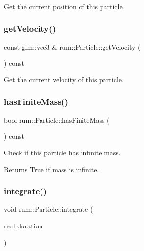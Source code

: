 Get the current position of this particle. \mbox{\label{classrum_1_1_particle_a49fafb2e446e26e2e2bedb772d6643fd}} 
\subsubsection{\texorpdfstring{get\+Velocity()}{getVelocity()}}
{\footnotesize\ttfamily const glm\+::vec3 \& rum\+::\+Particle\+::get\+Velocity (\begin{DoxyParamCaption}{ }\end{DoxyParamCaption}) const}

Get the current velocity of this particle. \mbox{\label{classrum_1_1_particle_a83071b132ef0961b63d05c68dd8ffb51}} 
\subsubsection{\texorpdfstring{has\+Finite\+Mass()}{hasFiniteMass()}}
{\footnotesize\ttfamily bool rum\+::\+Particle\+::has\+Finite\+Mass (\begin{DoxyParamCaption}{ }\end{DoxyParamCaption}) const}

Check if this particle has infinite mass. \begin{DoxyReturn}{Returns}
True if mass is infinite. 
\end{DoxyReturn}
\mbox{\label{classrum_1_1_particle_a6eb27b64ae963d386cf563bafade51c5}} 
\subsubsection{\texorpdfstring{integrate()}{integrate()}}
{\footnotesize\ttfamily void rum\+::\+Particle\+::integrate (\begin{DoxyParamCaption}\item[{\mbox{\hyperlink{namespacerum_a7e8cca23573d5eaead0f138cbaa4862c}{real}}}]{duration }\end{DoxyParamCaption})\hspace{0.3cm}{\ttfamily [virtual]}}

